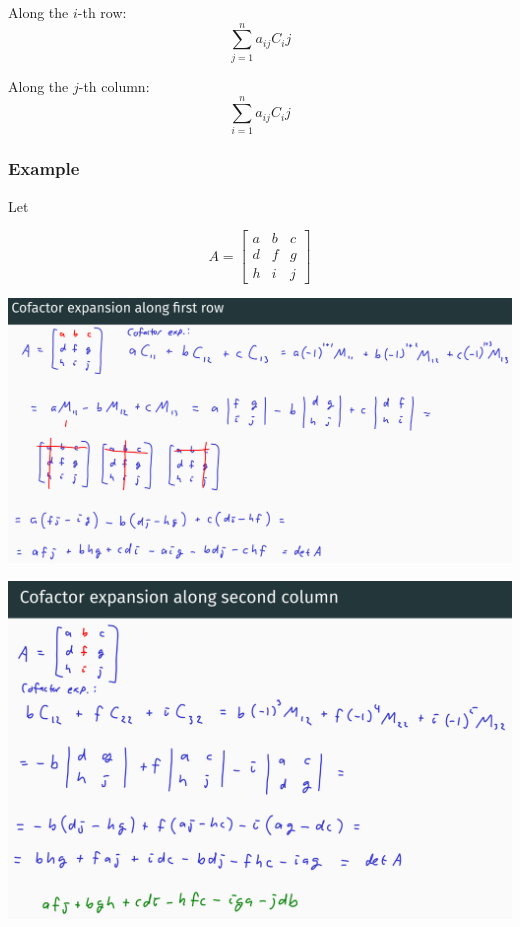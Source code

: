 \documentclass[11pt]{article}
\begin{document}
Along the \(i\)-th row:
\[\sum_{j = 1}^n a_{ij} C_ij\]

Along the \(j\)-th column:
\[\sum_{i = 1}^n a_{ij} C_ij\]

 \newpage

\subsubsection{Example}
\label{sec:org050213d}
Let

\begin{displaymath}
A = \begin{bmatrix}
a & b & c \\
d & f & g \\
h & i & j
\end{bmatrix}
\end{displaymath}

\begin{center}
\includegraphics[width=.9\linewidth]{./images/cofactor-expansion-along-the-first-row.png}
\end{center}

\begin{center}
\includegraphics[width=.9\linewidth]{./images/cofactor-expansion-along-the-second-column.png}
\end{center}
\end{document}
